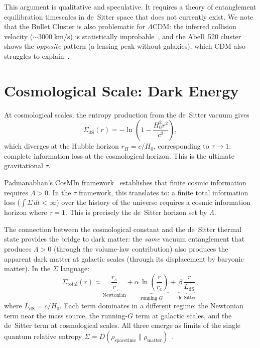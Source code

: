 \documentclass[prd,twocolumn,superscriptaddress,longbibliography,floatfix]{revtex4-2}
\newcommand{\KL}{D}
\newcommand{\tauasym}{\tau}
\begin{document}
This argument is qualitative and speculative.  It requires a
theory of entanglement equilibration timescales in de~Sitter
space that does not currently exist.  We note that the Bullet
Cluster is also problematic for $\Lambda$CDM: the inferred
collision velocity ($\sim\!3000\;\mathrm{km/s}$) is
statistically improbable~\cite{Lee2010}, and the Abell~520
cluster shows the \emph{opposite} pattern (a lensing peak
without galaxies), which CDM also struggles to
explain~\cite{Jee2007}.

\section{Cosmological Scale: Dark Energy}
\label{sec:cosmo}

At cosmological scales, the entropy production from the
de~Sitter vacuum gives
\begin{equation}
\Sigma_{\mathrm{dS}}(r) = -\ln\!\left(1 -
\frac{H_0^2 r^2}{c^2}\right),
\label{eq:sigma_dS}
\end{equation}
which diverges at the Hubble horizon $r_H = c/H_0$,
corresponding to $\tauasym \to 1$: complete information loss
at the cosmological horizon.  This is the ultimate
gravitational $\tauasym$.

Padmanabhan's CosMIn framework~\cite{Padmanabhan2017}
establishes that finite cosmic information requires
$\Lambda > 0$.  In the $\tauasym$ framework, this translates
to: a finite total information loss ($\int \Sigma\,dt < \infty$)
over the history of the universe requires a cosmic information
horizon where $\tauasym = 1$.  This is precisely the
de~Sitter horizon set by $\Lambda$.

The connection between the cosmological constant and the
de~Sitter thermal state provides the bridge to dark matter:
the \emph{same} vacuum entanglement that produces
$\Lambda > 0$ (through the volume-law contribution) also
produces the apparent dark matter at galactic scales (through
its displacement by baryonic matter).  In the
$\Sigma$ language:
\begin{equation}
\Sigma_{\mathrm{total}}(r) \approx
\underbrace{\frac{r_s}{r}}_{\text{Newtonian}} +
\underbrace{\alpha\,\ln\!\left(\frac{r}{r_c}\right)
}_{\text{running }G} +
\underbrace{\beta\,\frac{r}{L_{\mathrm{dS}}}
}_{\text{de Sitter}},
\label{eq:sigma_total}
\end{equation}
where $L_{\mathrm{dS}} = c/H_0$.  Each term dominates in a
different regime: the Newtonian term near the mass source, the
running-$G$ term at galactic scales, and the de~Sitter term at
cosmological scales.  All three emerge as limits of the single
quantum relative entropy
$\Sigma = \KL(\rho_{\mathrm{spacetime}} \|
\rho_{\mathrm{matter}})$~\cite{Paper2,Bianconi2025}.
\end{document}
